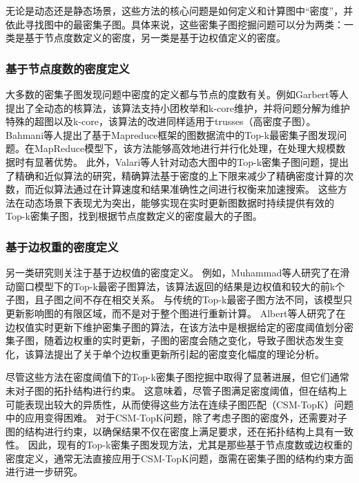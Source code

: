 无论是动态还是静态场景，这些方法的核心问题是如何定义和计算图中“密度”，并依此寻找图中的最密集子图。具体来说，这些密集子图挖掘问题可以分为两类：一类是基于节点度数定义的密度，另一类是基于边权值定义的密度。

\subsubsection{基于节点度数的密度定义}
大多数的密集子图发现问题中密度的定义都与节点的度数有关。例如Garbert等人\cite{dsm-noweight-Gabert-DBLP:conf/wsdm/GabertPC21}提出了全动态的核算法，该算法支持小团枚举和k-core维护，并将问题分解为维护特殊的超图以及k-core，该算法的改进同样适用于trusses（高密度子图）。
Bahmani等人\cite{dsm-noweight-Bahmani-DBLP:journals/pvldb/BahmaniKV12}提出了基于Mapreduce框架的图数据流中的Top-k最密集子图发现问题。在MapReduce模型\cite{csm-mapreduce-DBLP:journals/cacm/DeanG08}下，该方法能够高效地进行并行化处理，在处理大规模数据时有显著优势。
此外，Valari等人\cite{dsm-noweight-Valari-DBLP:conf/ssdbm/ValariKP12}针对动态大图中的Top-k密集子图问题，提出了精确和近似算法的研究，精确算法基于密度的上下限来减少了精确密度计算的次数，而近似算法通过在计算速度和结果准确性之间进行权衡来加速搜索。
这些方法在动态场景下表现尤为突出，能够实现在实时更新图数据时持续提供有效的Top-k密集子图，找到根据节点度数定义的密度最大的子图。

\subsubsection{基于边权重的密度定义}
另一类研究则关注于基于边权值的密度定义。
例如，Muhammad\cite{dsm-weight-Muhammad-DBLP:conf/cikm/NasirGMG17}等人研究了在滑动窗口模型下的Top-k最密子图算法，该算法返回的结果是边权值和较大的前k个子图，且子图之间不存在相交关系。
与传统的Top-k最密子图方法不同，该模型只更新影响图的有限区域，而不是对于整个图进行重新计算。
Albert等人\cite{dsm-weight-Angel-DBLP:journals/vldb/AngelKSSST14}研究了在边权值实时更新下维护密集子图的算法，在该方法中是根据给定的密度阈值划分密集子图，随着边权重的实时更新，子图的密度会随之变化，导致子图状态发生变化，该算法提出了关于单个边权重更新所引起的密度变化幅度的理论分析。

尽管这些方法在密度阈值下的Top-k密集子图挖掘中取得了显著进展，但它们通常未对子图的拓扑结构进行约束。
这意味着，尽管子图满足密度阈值，但在结构上可能表现出较大的异质性，从而使得这些方法在连续子图匹配（CSM-TopK）问题中的应用变得困难。
对于CSM-TopK问题，除了考虑子图的密度外，还需要对子图的结构进行约束，以确保结果不仅在密度上满足要求，还在拓扑结构上具有一致性。
因此，现有的Top-k密集子图发现方法，尤其是那些基于节点度数或边权重的密度定义，通常无法直接应用于CSM-TopK问题，亟需在密集子图的结构约束方面进行进一步研究。

